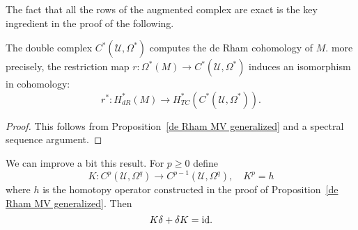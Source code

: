 The fact that all the rows of the augmented complex are exact is the key ingredient in the proof of the following.
\begin{theorem}
The double complex $C^*(\mathcal{U},\Omega^*)$ computes the de Rham cohomology of $M$. more precisely, the restriction map $r:\Omega^*(M)\to C^*(\mathcal{U},\Omega^*)$ 
induces an isomorphism in cohomology:
\[r^*:H^*_{dR}(M)\to H^*_{TC}(C^*(\mathcal{U},\Omega^*)).\]
\end{theorem}
\begin{proof}
This follows from Proposition~\ref{de Rham MV generalized} and a spectral sequence argument.
\end{proof}
We can improve a bit this result. For $p\geq 0$ define
\[K:C^p(\mathcal{U},\Omega^q)\to C^{p-1}(\mathcal{U},\Omega^q),\quad K^p=h\]
where $h$ is the homotopy operator constructed in the proof of Proposition~\ref{de Rham MV generalized}. Then
\[K\delta+\delta K=\mathrm{id}.\]

